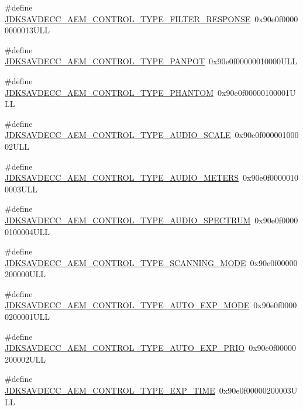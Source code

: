 \begin{DoxyCompactItemize}
\item 
\#define \hyperlink{group__control__type_gaf4c6caad5080bcba42b56f7ce2a058ba}{J\+D\+K\+S\+A\+V\+D\+E\+C\+C\+\_\+\+A\+E\+M\+\_\+\+C\+O\+N\+T\+R\+O\+L\+\_\+\+T\+Y\+P\+E\+\_\+\+F\+I\+L\+T\+E\+R\+\_\+\+R\+E\+S\+P\+O\+N\+SE}~0x90e0f00000000013\+U\+LL
\item 
\#define \hyperlink{group__control__type_ga1c3838df63cc94462c7c244c780cdccb}{J\+D\+K\+S\+A\+V\+D\+E\+C\+C\+\_\+\+A\+E\+M\+\_\+\+C\+O\+N\+T\+R\+O\+L\+\_\+\+T\+Y\+P\+E\+\_\+\+P\+A\+N\+P\+OT}~0x90e0f00000010000\+U\+LL
\item 
\#define \hyperlink{group__control__type_gab700742b49c0fdf48322ae739549012b}{J\+D\+K\+S\+A\+V\+D\+E\+C\+C\+\_\+\+A\+E\+M\+\_\+\+C\+O\+N\+T\+R\+O\+L\+\_\+\+T\+Y\+P\+E\+\_\+\+P\+H\+A\+N\+T\+OM}~0x90e0f00000100001\+U\+LL
\item 
\#define \hyperlink{group__control__type_ga73a4dcc18a63bc56f9923b7ae49e1852}{J\+D\+K\+S\+A\+V\+D\+E\+C\+C\+\_\+\+A\+E\+M\+\_\+\+C\+O\+N\+T\+R\+O\+L\+\_\+\+T\+Y\+P\+E\+\_\+\+A\+U\+D\+I\+O\+\_\+\+S\+C\+A\+LE}~0x90e0f00000100002\+U\+LL
\item 
\#define \hyperlink{group__control__type_gacbf209bd2cfb47c0afdf73978ecd4b8f}{J\+D\+K\+S\+A\+V\+D\+E\+C\+C\+\_\+\+A\+E\+M\+\_\+\+C\+O\+N\+T\+R\+O\+L\+\_\+\+T\+Y\+P\+E\+\_\+\+A\+U\+D\+I\+O\+\_\+\+M\+E\+T\+E\+RS}~0x90e0f00000100003\+U\+LL
\item 
\#define \hyperlink{group__control__type_ga9a6db22ec313ab279c0b9aa098089133}{J\+D\+K\+S\+A\+V\+D\+E\+C\+C\+\_\+\+A\+E\+M\+\_\+\+C\+O\+N\+T\+R\+O\+L\+\_\+\+T\+Y\+P\+E\+\_\+\+A\+U\+D\+I\+O\+\_\+\+S\+P\+E\+C\+T\+R\+UM}~0x90e0f00000100004\+U\+LL
\item 
\#define \hyperlink{group__control__type_gacc18aaaea373527fe5cc73bdc821484d}{J\+D\+K\+S\+A\+V\+D\+E\+C\+C\+\_\+\+A\+E\+M\+\_\+\+C\+O\+N\+T\+R\+O\+L\+\_\+\+T\+Y\+P\+E\+\_\+\+S\+C\+A\+N\+N\+I\+N\+G\+\_\+\+M\+O\+DE}~0x90e0f00000200000\+U\+LL
\item 
\#define \hyperlink{group__control__type_ga0332c53e98e09c9931c6e662a53d4704}{J\+D\+K\+S\+A\+V\+D\+E\+C\+C\+\_\+\+A\+E\+M\+\_\+\+C\+O\+N\+T\+R\+O\+L\+\_\+\+T\+Y\+P\+E\+\_\+\+A\+U\+T\+O\+\_\+\+E\+X\+P\+\_\+\+M\+O\+DE}~0x90e0f00000200001\+U\+LL
\item 
\#define \hyperlink{group__control__type_gabd4307324502f7775f61673dc7d69da1}{J\+D\+K\+S\+A\+V\+D\+E\+C\+C\+\_\+\+A\+E\+M\+\_\+\+C\+O\+N\+T\+R\+O\+L\+\_\+\+T\+Y\+P\+E\+\_\+\+A\+U\+T\+O\+\_\+\+E\+X\+P\+\_\+\+P\+R\+IO}~0x90e0f00000200002\+U\+LL
\item 
\#define \hyperlink{group__control__type_gafdc0fc698e76d4bf980b55490f5807b3}{J\+D\+K\+S\+A\+V\+D\+E\+C\+C\+\_\+\+A\+E\+M\+\_\+\+C\+O\+N\+T\+R\+O\+L\+\_\+\+T\+Y\+P\+E\+\_\+\+E\+X\+P\+\_\+\+T\+I\+ME}~0x90e0f00000200003\+U\+LL

\end{DoxyCompactItemize}
